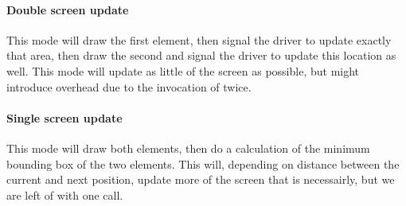 \paragraph{Double screen update}
This mode will draw the first element, then signal the driver to update exactly that area, then draw the second and signal the driver to update this location as well. This mode will update as little of the screen as possible, but might introduce overhead due to the invocation of  twice.

\paragraph{Single screen update}
This mode will draw both elements, then do a calculation of the minimum bounding box of the two elements. This will, depending on distance between the current and next position, update more of the screen that is necessairly, but we are left of with one  call.\\

